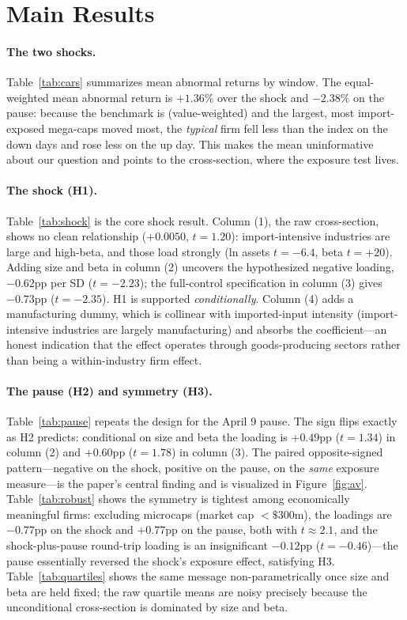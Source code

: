 \documentclass[12pt]{article}
\begin{document}
\section{Main Results}\label{sec:res}
\paragraph{The two shocks.} Table~\ref{tab:cars} summarizes mean abnormal returns by window.
The equal-weighted mean abnormal return is $+1.36\%$ over the shock and $-2.38\%$ on the
pause: because the benchmark is (value-weighted) and the largest, most import-exposed
mega-caps moved most, the \emph{typical} firm fell less than the index on the down days and
rose less on the up day. This makes the mean uninformative about our question and points to
the cross-section, where the exposure test lives.

\paragraph{The shock (H1).} Table~\ref{tab:shock} is the core shock result. Column (1), the
raw cross-section, shows no clean relationship ($+0.0050$, $t=1.20$): import-intensive
industries are large and high-beta, and those load strongly (ln assets $t=-6.4$, beta
$t=+20$). Adding size and beta in column (2) uncovers the hypothesized negative loading,
$-0.62$pp per SD ($t=-2.23$); the full-control specification in column (3) gives $-0.73$pp
($t=-2.35$). H1 is supported \emph{conditionally}. Column (4) adds a manufacturing dummy,
which is collinear with imported-input intensity (import-intensive industries are largely
manufacturing) and absorbs the coefficient---an honest indication that the effect operates
through goods-producing sectors rather than being a within-industry firm effect.

\paragraph{The pause (H2) and symmetry (H3).} Table~\ref{tab:pause} repeats the design for
the April 9 pause. The sign flips exactly as H2 predicts: conditional on size and beta the
loading is $+0.49$pp ($t=1.34$) in column (2) and $+0.60$pp ($t=1.78$) in column (3). The
paired opposite-signed pattern---negative on the shock, positive on the pause, on the
\emph{same} exposure measure---is the paper's central finding and is visualized in
Figure~\ref{fig:av}. Table~\ref{tab:robust} shows the symmetry is tightest among
economically meaningful firms: excluding microcaps (market cap $<\$300$m), the loadings are
$-0.77$pp on the shock and $+0.77$pp on the pause, both with $t\approx2.1$, and the
shock-plus-pause round-trip loading is an insignificant $-0.12$pp ($t=-0.46$)---the pause
essentially reversed the shock's exposure effect, satisfying H3. Table~\ref{tab:quartiles}
shows the same message non-parametrically once size and beta are held fixed; the raw
quartile means are noisy precisely because the unconditional cross-section is dominated by
size and beta.
\end{document}
